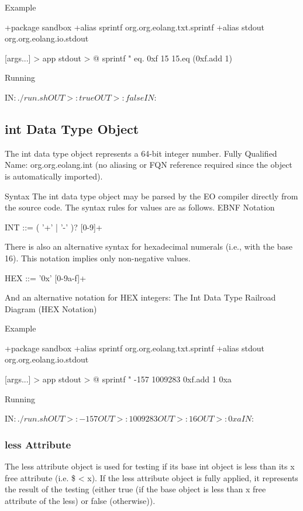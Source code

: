 \documentclass[12pt]{book}
\begin{document}
Example
\begin{ffcode}
+package sandbox
+alias sprintf org.org.eolang.txt.sprintf
+alias stdout org.org.eolang.io.stdout

[args...] > app
  stdout > @
    sprintf
      "%
      eq.
        0xf
        15
      15.eq (0xf.add 1)

Running

IN$: ./run.sh
OUT>: true
OUT>: false
IN$: 
\end{ffcode}

\subsection{int Data Type Object}
The int data type object represents a 64-bit integer number.
Fully Qualified Name: org.org.eolang.int (no aliasing or FQN reference required since the object is automatically imported).

Syntax
The int data type object may be parsed by the EO compiler directly from the source code. The syntax rules for values are as follows.
EBNF Notation

\begin{ffcode}
INT      ::= ( '+' | '-' )? [0-9]+
\end{ffcode}
There is also an alternative syntax for hexadecimal numerals (i.e., with the base 16). This notation implies only non-negative values.

\begin{ffcode}
HEX      ::= '0x' [0-9a-f]+
\end{ffcode}


And an alternative notation for HEX integers:
The Int Data Type Railroad Diagram (HEX Notation)

Example
\begin{ffcode}
+package sandbox
+alias sprintf org.org.eolang.txt.sprintf
+alias stdout org.org.eolang.io.stdout

[args...] > app
  stdout > @
    sprintf
      "%
      -157
      1009283
      0xf.add 1
      0xa

Running

IN$: ./run.sh
OUT>: -157
OUT>: 1009283
OUT>: 16
OUT>: 0xa
IN$: 
\end{ffcode}

\subsubsection{less Attribute}
The less attribute object is used for testing if its base int object is less than its x free attribute (i.e. \$ < x).
If the less attribute object is fully applied, it represents the result of the testing (either true (if the base object is less than x free attribute of the less) or false (otherwise)).
\end{document}
